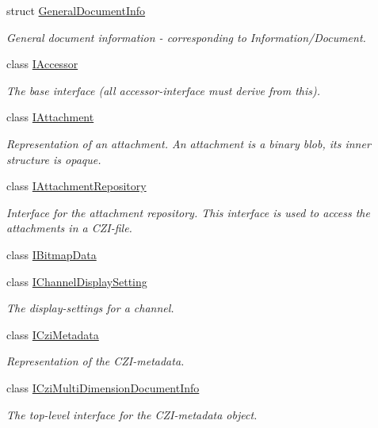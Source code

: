 \begin{DoxyCompactItemize}
struct \hyperlink{structlib_c_z_i_1_1_general_document_info}{General\+Document\+Info}
\begin{DoxyCompactList}\small\item\em General document information -\/ corresponding to Information/\+Document. \end{DoxyCompactList}\item 
class \hyperlink{classlib_c_z_i_1_1_i_accessor}{I\+Accessor}
\begin{DoxyCompactList}\small\item\em The base interface (all accessor-\/interface must derive from this). \end{DoxyCompactList}\item 
class \hyperlink{classlib_c_z_i_1_1_i_attachment}{I\+Attachment}
\begin{DoxyCompactList}\small\item\em Representation of an attachment. An attachment is a binary blob, its inner structure is opaque. \end{DoxyCompactList}\item 
class \hyperlink{classlib_c_z_i_1_1_i_attachment_repository}{I\+Attachment\+Repository}
\begin{DoxyCompactList}\small\item\em Interface for the attachment repository. This interface is used to access the attachments in a C\+Z\+I-\/file. \end{DoxyCompactList}\item 
class \hyperlink{classlib_c_z_i_1_1_i_bitmap_data}{I\+Bitmap\+Data}
\item 
class \hyperlink{classlib_c_z_i_1_1_i_channel_display_setting}{I\+Channel\+Display\+Setting}
\begin{DoxyCompactList}\small\item\em The display-\/settings for a channel. \end{DoxyCompactList}\item 
class \hyperlink{classlib_c_z_i_1_1_i_czi_metadata}{I\+Czi\+Metadata}
\begin{DoxyCompactList}\small\item\em Representation of the C\+Z\+I-\/metadata. \end{DoxyCompactList}\item 
class \hyperlink{classlib_c_z_i_1_1_i_czi_multi_dimension_document_info}{I\+Czi\+Multi\+Dimension\+Document\+Info}
\begin{DoxyCompactList}\small\item\em The top-\/level interface for the C\+Z\+I-\/metadata object. \end{DoxyCompactList}\item 

\end{DoxyCompactItemize}
